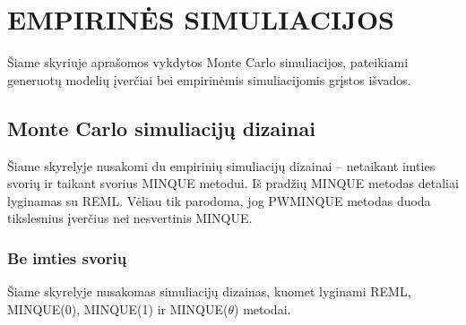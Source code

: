 \documentclass[11pt,a4paper]{article}
\begin{document}
\newpage
\section{EMPIRINĖS SIMULIACIJOS} \label{sec:simul}
\indent Šiame skyriuje aprašomos vykdytos Monte Carlo simuliacijos, pateikiami generuotų modelių įverčiai bei empirinėmis simuliacijomis grįstos išvados.


\subsection{Monte Carlo simuliacijų dizainai}
\indent Šiame skyrelyje nusakomi du empirinių simuliacijų dizainai -- netaikant imties svorių ir taikant svorius MINQUE metodui. Iš pradžių MINQUE metodas detaliai lyginamas su REML. Vėliau tik parodoma, jog PWMINQUE metodas duoda tikslesnius įverčius nei nesvertinis MINQUE.

\subsubsection{Be imties svorių}\label{subsubsec:besvoriu}
\indent Šiame skyrelyje nusakomas simuliacijų dizainas, kuomet lyginami REML, MINQUE(0), MINQUE(1) ir MINQUE($\theta$) metodai.
\end{document}

